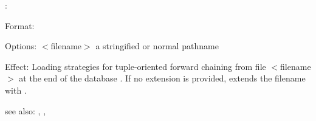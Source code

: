 :

Format: 

Options: $<$filename$>$ a stringified or normal pathname

Effect: Loading strategies for tuple-oriented forward chaining from file
	$<$filename$>$ at the end of the database .
        If no extension is provided, \COLAB{} extends the filename with .

see also: \consult, \destroy, \replace
